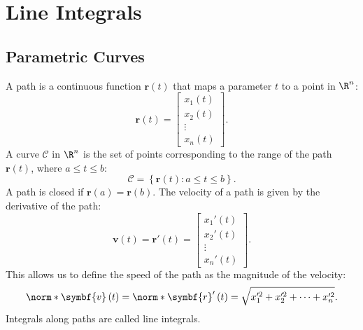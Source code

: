 \documentclass{article}
\begin{document}
\section{Line Integrals}
\subsection{Parametric Curves}
A path is a continuous function \(\symbf{r}\left( t \right)\) that
maps a parameter \(t\) to a point in \(\R^n\):
\begin{equation*}
    \symbf{r}\left( t \right) = \begin{bmatrix}
        x_1\left( t \right) \\
        x_2\left( t \right) \\
        \vdots              \\
        x_n\left( t \right)
    \end{bmatrix}.
\end{equation*}
A curve \(\mathscr{C}\) in \(\R^n\) is the set of points corresponding
to the range of the path \(\symbf{r}\left( t \right)\), where
\(a \leqslant t \leqslant b\):
\begin{equation*}
    \mathscr{C} = \left\{ \symbf{r}\left( t \right) : a \leqslant t \leqslant b \right\}.
\end{equation*}
A path is closed if \(\symbf{r}\left( a \right) = \symbf{r}\left( b \right)\).
The velocity of a path is given by the derivative of the path:
\begin{equation*}
    \symbf{v}\left( t \right) = \symbf{r}'\left( t \right) = \begin{bmatrix}
        x_1'\left( t \right) \\
        x_2'\left( t \right) \\
        \vdots               \\
        x_n'\left( t \right)
    \end{bmatrix}.
\end{equation*}
This allows us to define the speed of the path as the magnitude of the
velocity:
\begin{equation*}
    \norm*{\symbf{v}\left( t \right)} = \norm*{\symbf{r}'\left( t \right)} = \sqrt{x_1'^2 + x_2'^2 + \cdots + x_n'^2}.
\end{equation*}
Integrals along paths are called line integrals.
\end{document}
